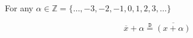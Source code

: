 \documentclass[preview]{standalone}
\begin{document}
\begin{center}
For any $\alpha \in \mathbb{Z} = \{ \dots, -3, -2, -1, 0, 1, 2, 3, \dots\}$

	\[
	\overline{x}  +  \alpha \stackrel{\mathtt{D}}{=} \overline{\left( x  +  \alpha \right)}
	\]
\end{center}
\end{document}
